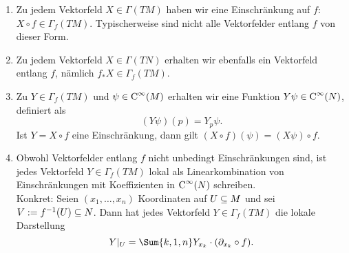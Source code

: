 \begin{bemerkungen}
\begin{enumerate}
\item Zu jedem Vektorfeld $X \in \Gamma(TM)$ haben wir eine Einschränkung auf $f$: $X \circ f \in \Gamma_f(TM)$. Typischerweise sind nicht alle Vektorfelder entlang $f$ von dieser Form.
\item Zu jedem Vektorfeld $X \in \Gamma (TN)$ erhalten wir ebenfalls ein Vektorfeld entlang $f$, nämlich $f_\ast X \in \Gamma_f(TM)$.
\begin{center}
\end{center}
\item Zu $Y \in \Gamma_f(TM)$ und $\psi \in \cinf{M}$ erhalten wir eine Funktion $Y \psi \in \cinf{N}$, definiert als
\begin{equation}
(Y \psi)(p) = Y_p \psi.
\end{equation}
Ist $Y=X \circ f$ eine Einschränkung, dann gilt $(X \circ f)(\psi) = (X \psi) \circ f$.
\item Obwohl Vektorfelder entlang $f$ nicht unbedingt Einschränkungen sind, ist jedes Vektorfeld $Y \in \Gamma_f(TM)$ lokal als Linearkombination von Einschränkungen mit Koeffizienten in $\cinf{N}$ schreiben.\\
Konkret: Seien $(x_1, \dots, x_n)$ Koordinaten auf $U \subseteq M$ und sei $V := f^{-1}(U) \subseteq N$. Dann hat jedes Vektorfeld $Y \in \Gamma_f(TM)$ die lokale Darstellung
\begin{equation}
Y|_U = \Sum{k,1,n} Y_{x_k} \cdot (\partial_{x_k} \circ f).
\end{equation}
\end{enumerate}
\end{bemerkungen}
